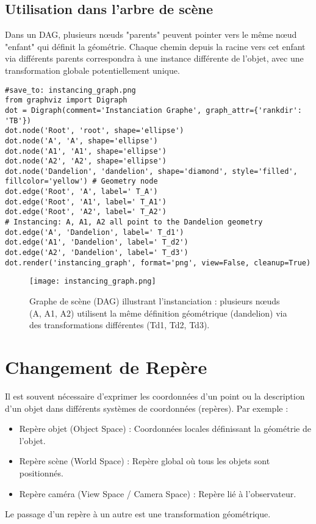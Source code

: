 \subsection{Utilisation dans l'arbre de scène}
Dans un DAG, plusieurs nœuds "parents" peuvent pointer vers le même nœud "enfant" qui définit la géométrie. Chaque chemin depuis la racine vers cet enfant via différents parents correspondra à une instance différente de l'objet, avec une transformation globale potentiellement unique.
\begin{verbatim}
#save_to: instancing_graph.png
from graphviz import Digraph
dot = Digraph(comment='Instanciation Graphe', graph_attr={'rankdir': 'TB'})
dot.node('Root', 'root', shape='ellipse')
dot.node('A', 'A', shape='ellipse')
dot.node('A1', 'A1', shape='ellipse')
dot.node('A2', 'A2', shape='ellipse')
dot.node('Dandelion', 'dandelion', shape='diamond', style='filled', fillcolor='yellow') # Geometry node
dot.edge('Root', 'A', label=' T_A')
dot.edge('Root', 'A1', label=' T_A1')
dot.edge('Root', 'A2', label=' T_A2')
# Instancing: A, A1, A2 all point to the Dandelion geometry
dot.edge('A', 'Dandelion', label=' T_d1')
dot.edge('A1', 'Dandelion', label=' T_d2')
dot.edge('A2', 'Dandelion', label=' T_d3')
dot.render('instancing_graph', format='png', view=False, cleanup=True)
\end{verbatim}
\begin{figure}[H]
\centering
\texttt{[image: instancing\_graph.png]}
\caption{Graphe de scène (DAG) illustrant l'instanciation : plusieurs nœuds (A, A1, A2) utilisent la même définition géométrique (dandelion) via des transformations différentes (Td1, Td2, Td3).}
\label{fig:instancing_graph}
\end{figure}
\section{Changement de Repère}
Il est souvent nécessaire d'exprimer les coordonnées d'un point ou la description d'un objet dans différents systèmes de coordonnées (repères). Par exemple :
\begin{itemize}
    \item Repère objet (Object Space) : Coordonnées locales définissant la géométrie de l'objet.
    \item Repère scène (World Space) : Repère global où tous les objets sont positionnés.
    \item Repère caméra (View Space / Camera Space) : Repère lié à l'observateur.
\end{itemize}
Le passage d'un repère à un autre est une transformation géométrique.
